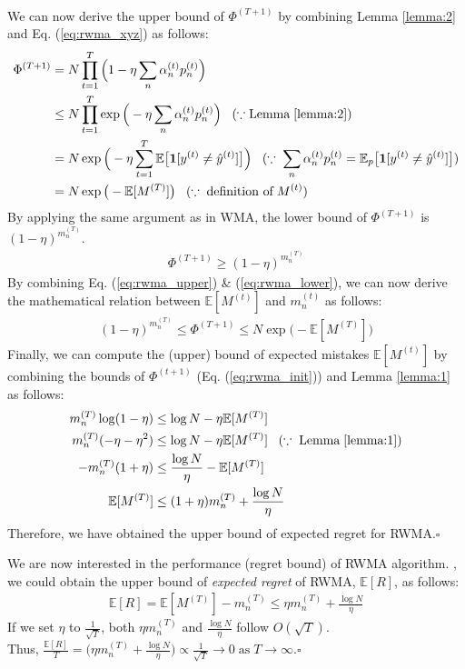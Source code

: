 \documentclass[11pt]{article}
\newcommand*{\QED}{\hfill\ensuremath{\square}}
\begin{document}
{\begin{align}
\end{align}
We can now derive the upper bound of $\Phi^{(T+1)}$ by combining Lemma \ref{lemma:2} and Eq. (\ref{eq:rwma_xyz}) as follows:
\begin{align}
    \Phi^{(T+1)}&=N\prod_{t=1}^{T}\Big(1-\eta\sum_n\alpha_n^{(t)}p_n^{(t)}\Big)\nonumber\\
    &\leq N\prod_{t=1}^T\exp{\Big(-\eta\sum_n\alpha_n^{(t)}p_n^{(t)}\Big)}\;\;\;(\because \text{Lemma}\;\ref{lemma:2})\nonumber\\
    &=N\exp{\Big(-\eta\sum_{t=1}^{T}\mathbb{E}\big[\textbf{1}[y^{(t)}\neq\hat{y}^{(t)}]\big]\Big)}\;\;\;(\because\;\sum_n\alpha_n^{(t)}p_n^{(t)}=\mathbb{E}_p\big[\textbf{1}[y^{(t)}\neq\hat{y}^{(t)}]\big])\nonumber\\
    &=N\exp{\big(-\mathbb{E}[M^{(T)}]\big)}\;\;\;(\because\;\text{definition of}\;M^{(t)})\label{eq:rwma_upper}
\end{align}
By applying the same argument as in WMA, the lower bound of $\Phi^{(T+1)}$ is $(1-\eta)^{m_n^{(T)}}$.
\begin{align}
    \Phi^{(T+1)}\geq(1-\eta)^{m_n^{(T)}}\label{eq:rwma_lower}
\end{align}
By combining Eq. (\ref{eq:rwma_upper}) \& (\ref{eq:rwma_lower}), we can now derive the mathematical relation between $\mathbb{E}[M^{(t)}]$ and $m_n^{(t)}$ as follows:
\begin{align}
    (1-\eta)^{m_n^{(T)}}\leq \Phi^{(T+1)} \leq N\exp{\big(-\mathbb{E}[M^{(T)}]\big)}\label{eq:rwma_init}
\end{align}
Finally, we can compute the (upper) bound of expected mistakes $\mathbb{E}[M^{(t)}]$ by combining the bounds of $\Phi^{(t+1)}$ (Eq. (\ref{eq:rwma_init})) and Lemma \ref{lemma:1} as follows:
\begin{align*}
    m_n^{(T)}\log(1-\eta) &\leq \log N - \eta\mathbb{E}[M^{(T)}]\\
    m_n^{(T)}(-\eta-\eta^2)&\leq \log N - \eta\mathbb{E}[M^{(T)}] \;\;\;(\because\; \text{Lemma}\;\ref{lemma:1})\\
    -m_n^{(T)}(1+\eta)&\leq\frac{\log N}{\eta} - \mathbb{E}[M^{(T)}]\\
    \mathbb{E}[M^{(T)}]&\leq (1+\eta)m_n^{(T)} + \frac{\log N}{\eta}
\end{align*}
Therefore, we have obtained the upper bound of expected regret for RWMA.\QED
}

We are now interested in the performance (regret bound) of RWMA algorithm.
, we could obtain the upper bound of \textit{expected regret} of RWMA, $\mathbb{E}[R]$, as follows:
\begin{align}
    \mathbb{E}[R] = \mathbb{E}[M^{(T)}] - m_n^{(T)} \leq \eta m_n^{(T)} + \frac{\log N}{\eta} \label{eq:rwma_final}
\end{align}
If we set $\eta$ to $\frac{1}{\sqrt{T}}$, both $\eta m_n^{(T)}$ and $\frac{\log N}{\eta}$ follow $O(\sqrt{T})$.\\
Thus, $\frac{\mathbb{E}[R]}{T} = \Big(\eta m_n^{(T)} + \frac{\log N}{\eta}\Big) \propto \frac{1}{\sqrt{T}}\rightarrow 0\;\text{as}\;T\rightarrow\infty$.\QED
\end{document}
